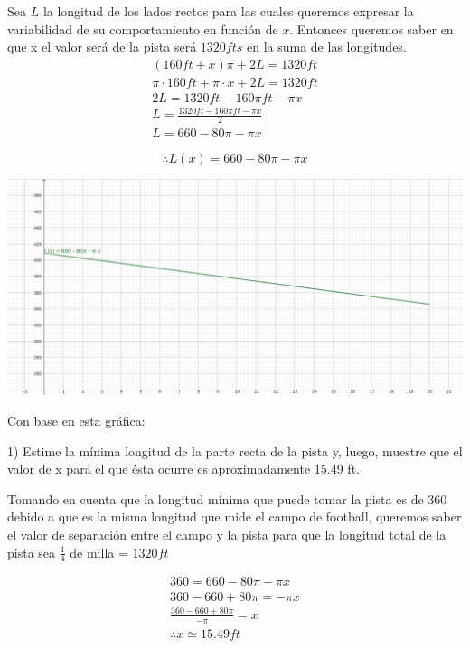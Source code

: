 Sea $L$ la longitud de los lados rectos para las cuales queremos expresar la variabilidad de su comportamiento en función de $x$.
Entonces queremos saber en que x el valor será de la pista será $1320fts$ en la suma de las longitudes.
\begin{gather*}
    (160ft+x)\pi + 2L = 1320ft\\
    \pi\cdot160ft+\pi\cdot x + 2L = 1320ft\\
    2L = 1320ft - 160\pi ft -\pi x\\
    L=\frac{1320ft - 160\pi ft -\pi x}{2}\\
    L=660-80\pi - \pi x
\end{gather*}

$$\therefore L(x)=660 - 80\pi-\pi x$$

\begin{center}
        \includegraphics[height = 0.3\textheight]{recursos/geogebra-export.png}\par
\end{center}


Con base en esta
gráfica:

1) Estime la mínima longitud de la parte recta de la pista y, luego, muestre que el valor de x para el que ésta ocurre es aproximadamente 15.49 ft.

Tomando en cuenta que la longitud mínima que puede tomar la pista es de 360 debido a que es la misma longitud que mide el campo de football, queremos saber el valor de separación entre el campo y la pista para que la longitud total de la pista sea $\frac{1}{4}$ de milla = $1320ft$

\begin{gather*}
    360=660-80\pi-\pi x\\
    360-660+80\pi=-\pi x\\
    \frac{360-660+80\pi}{-\pi}=x\\
    \therefore x\simeq 15.49ft
\end{gather*}

